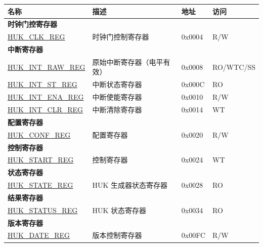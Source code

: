 \begin{longtable}{ | p{6cm} | p{7.2cm} | p{1.3cm} | p{1cm} | }
\hline\rowcolor{lightgray}
\textbf{名称} & \textbf{描述} &  \textbf{地址} & \textbf{访问} \\ \hline
\endhead
\multicolumn{4}{|l|}{\textbf{时钟门控寄存器}} \\ \hline
\hyperref[regdesc:HUKCLKREG]{HUK\_CLK\_REG} & 时钟门控制寄存器 & 0x0004 & R/W \\ \hline
\multicolumn{4}{|l|}{\textbf{中断寄存器}} \\ \hline
\hyperref[regdesc:HUKINTRAWREG]{HUK\_INT\_RAW\_REG} & 原始中断寄存器（电平有效） & 0x0008 & RO/WTC/SS \\ \hline
\hyperref[regdesc:HUKINTSTREG]{HUK\_INT\_ST\_REG} & 中断状态寄存器 & 0x000C & RO \\ \hline
\hyperref[regdesc:HUKINTENAREG]{HUK\_INT\_ENA\_REG} & 中断使能寄存器 & 0x0010 & R/W \\ \hline
\hyperref[regdesc:HUKINTCLRREG]{HUK\_INT\_CLR\_REG} & 中断清除寄存器 & 0x0014 & WT \\ \hline
\multicolumn{4}{|l|}{\textbf{配置寄存器}} \\ \hline
\hyperref[regdesc:HUKCONFREG]{HUK\_CONF\_REG} & 配置寄存器 & 0x0020 & R/W \\ \hline
\multicolumn{4}{|l|}{\textbf{控制寄存器}} \\ \hline
\hyperref[regdesc:HUKSTARTREG]{HUK\_START\_REG} & 控制寄存器 & 0x0024 & WT \\ \hline
\multicolumn{4}{|l|}{\textbf{状态寄存器}} \\ \hline
\hyperref[regdesc:HUKSTATEREG]{HUK\_STATE\_REG} & HUK 生成器状态寄存器 & 0x0028 & RO \\ \hline
\multicolumn{4}{|l|}{\textbf{结果寄存器}} \\ \hline
\hyperref[regdesc:HUKSTATUSREG]{HUK\_STATUS\_REG} & HUK 状态寄存器 & 0x0034 & RO \\ \hline
\multicolumn{4}{|l|}{\textbf{版本寄存器}} \\ \hline
\hyperref[regdesc:HUKDATEREG]{HUK\_DATE\_REG} & 版本控制寄存器 & 0x00FC & R/W \\ \hline
\end{longtable}